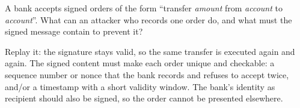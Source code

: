 \begin{exercise}
A bank accepts signed orders of the form \enquote{transfer \emph{amount} from \emph{account} to \emph{account}}. What can an attacker who records one order do, and what must the signed message contain to prevent it?
\end{exercise}
\begin{solution}
Replay it: the signature stays valid, so the same transfer is executed again and again. The signed content must make each order unique and checkable: a sequence number or nonce that the bank records and refuses to accept twice, and/or a timestamp with a short validity window. The bank's identity as recipient should also be signed, so the order cannot be presented elsewhere.
\end{solution}
